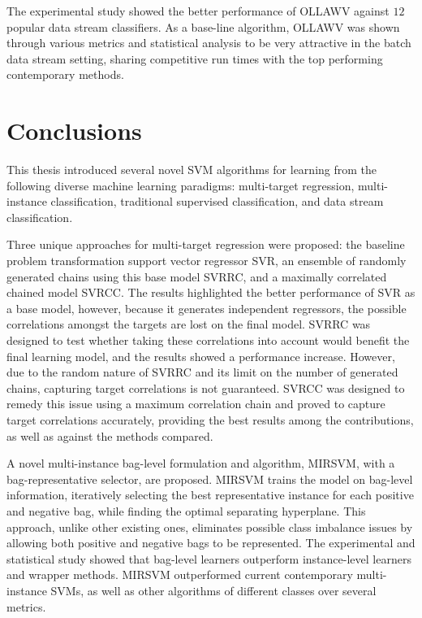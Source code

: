 \documentclass[reqno]{vcuthesis}
\numberwithin{equation}{chapter}
\begin{document}
The experimental study showed the better performance of OLLAWV against $12$ popular data stream classifiers. As a base-line algorithm, OLLAWV was shown through various metrics and statistical analysis to be very attractive in the batch data stream setting, sharing competitive run times with the top performing contemporary methods. 

\chapter{Conclusions}
This thesis introduced several novel SVM algorithms for learning from the following diverse machine learning paradigms: multi-target regression, multi-instance classification, traditional supervised classification, and data stream classification.

Three unique approaches for multi-target regression were proposed: the baseline problem transformation support vector regressor SVR, an ensemble of randomly generated chains using this base model SVRRC, and a maximally correlated chained model SVRCC. The results highlighted the better performance of SVR as a base model, however, because it generates independent regressors, the possible correlations amongst the targets are lost on the final model. SVRRC was designed to test whether taking these correlations into account would benefit the final learning model, and the results showed a performance increase. However, due to the random nature of SVRRC and its limit on the number of generated chains, capturing target correlations is not guaranteed. SVRCC was designed to remedy this issue using a maximum correlation chain and proved to capture target correlations accurately, providing the best results among the contributions, as well as against the methods compared. 

A novel multi-instance bag-level formulation and algorithm, MIRSVM, with a bag-representative selector, are proposed. MIRSVM trains the model on bag-level information, iteratively selecting the best representative instance for each positive and negative bag, while finding the optimal separating hyperplane. This approach, unlike other existing ones, eliminates possible class imbalance issues by allowing both positive and negative bags to be represented. The experimental and statistical study showed that bag-level learners outperform instance-level learners and wrapper methods. MIRSVM outperformed current contemporary multi-instance SVMs, as well as other algorithms of different classes over several metrics.
\end{document}
